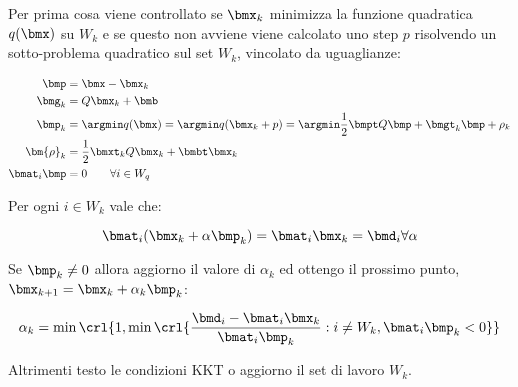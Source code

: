 \documentclass[\main/main.tex]{subfiles}
\begin{document}
Per prima cosa viene controllato se \(\bmx_k\) minimizza la funzione quadratica \(q(\bmx)\) su \(W_k\) e se questo non avviene viene calcolato uno step  \(p\) risolvendo un sotto-problema quadratico sul set \(W_k\), vincolato da uguaglianze:

\begin{align*}
	\bmp &= \bmx - \bmx_k\\
	\bmg_k &= Q\bmx_k + \bmb \\
	\bmp_k &= \argmin q(\bmx) = \argmin q(\bmx_k + p) = \argmin \frac{1}{2}\bmpt Q \bmp + \bmgt_k \bmp + \rho_k\\
	\bm{\rho}_k &= \frac{1}{2} \bmxt_k Q \bmx_k + \bmbt \bmx_k \\
	\bmat_i \bmp &= 0 \qquad \forall i \in W_q
\end{align*}

Per ogni \(i \in W_k\) vale che:

\[
	\bmat_i(\bmx_k + \alpha\bmp_k) = \bmat_i \bmx_k = \bmd_i \forall \alpha
\]

Se \(\bmp_k \neq 0\) allora aggiorno il valore di \(\alpha_k\) ed ottengo il prossimo punto, \(\bmx_{k+1} = \bmx_k + \alpha_k\bmp_k\):

\[
	\alpha_k = \min\crl{1, \min\crl{\frac{\bmd_i - \bmat_i\bmx_k}{\bmat_i \bmp_k}: i \neq W_k, \bmat_i\bmp_k < 0}}
\]

Altrimenti testo le condizioni KKT o aggiorno il set di lavoro \(W_k\).
\end{document}
